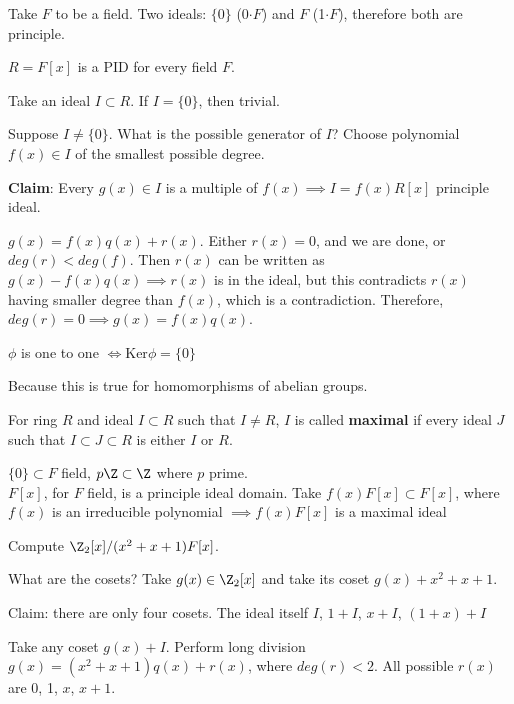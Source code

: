 \documentclass[10pt]{article}
\newcommand{\Ker}{\text{Ker}}
\begin{document}
Take $F$ to be a field. Two ideals: $\{0\}$ (0$\cdot F$) and $F$ (1$\cdot F$), therefore both are principle.

\begin{thm}
    $R = F[x]$ is a PID for every field $F$.
\end{thm}
Take an ideal $I \subset R$. If $I = \{0\}$, then trivial. 

Suppose $I\neq \{0\}$. What is the possible generator of $I$? Choose polynomial $f(x) \in I$ of the smallest possible degree.

\textbf{Claim}: Every $g(x) \in I$ is a multiple of $f(x) \implies I = f(x)R[x]$ principle ideal.

$g(x) = f(x)q(x) + r(x)$. Either $r(x) = 0$, and we are done, or $deg(r) < deg(f)$. Then $r(x)$ can be written as $g(x) - f(x)q(x) \implies r(x)$ is in the ideal, but this contradicts $r(x)$ having smaller degree than $f(x)$, which is a contradiction. Therefore, $deg(r) = 0 \implies g(x) = f(x)q(x)$.

\begin{rmk}
    $\phi$ is one to one $\iff \Ker\phi = \{0\}$
\end{rmk}
Because this is true for homomorphisms of abelian groups.

\begin{defn}
    For ring $R$ and ideal $I \subset R$ such that $I \neq R$, $I$ is called \textbf{maximal} if every ideal $J$ such that $I \subset J \subset R$ is either $I$ or $R$.
\end{defn}

\begin{exm*}
    $\{0\} \subset F$ field, $p\Z \subset \Z$ where $p$ prime.\\
    $F[x]$, for $F$ field, is a principle ideal domain. Take $f(x)F[x] \subset F[x]$, where $f(x)$ is an irreducible polynomial $\implies f(x)F[x]$ is a maximal ideal
\end{exm*}

\begin{exm*}
    Compute $\Z_2[x]/(x^2 + x + 1)F[x]$. 
\end{exm*}
What are the cosets? Take $g(x) \in \Z_2[x]$ and take its coset $g(x) + x^2 + x + 1$.

Claim: there are only four cosets. The ideal itself $I$, $1 + I$, $x + I$, $(1 + x) + I$

Take any coset $g(x) + I$. Perform long division $g(x) = (x^2 + x + 1)q(x) + r(x)$, where $deg(r) < 2$. All possible $r(x)$ are 0, 1, $x$, $x + 1$.
\end{document}
